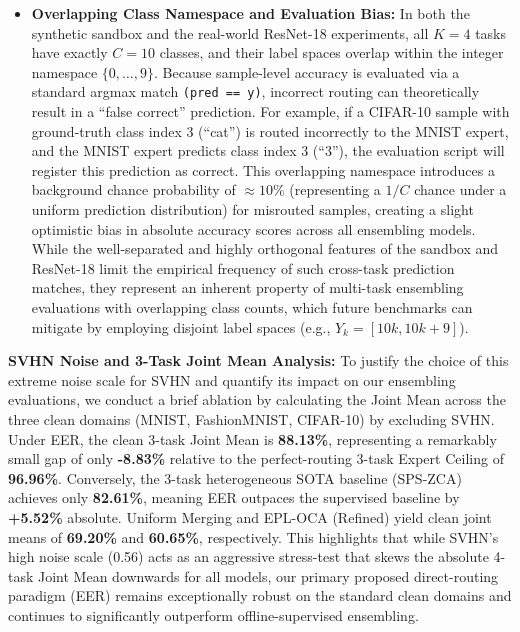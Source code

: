 \begin{itemize}
    \item \textbf{Overlapping Class Namespace and Evaluation Bias:} In both the synthetic sandbox and the real-world ResNet-18 experiments, all $K=4$ tasks have exactly $C=10$ classes, and their label spaces overlap within the integer namespace $\{0, \dots, 9\}$. Because sample-level accuracy is evaluated via a standard argmax match \texttt{(pred == y)}, incorrect routing can theoretically result in a ``false correct'' prediction. For example, if a CIFAR-10 sample with ground-truth class index 3 (``cat'') is routed incorrectly to the MNIST expert, and the MNIST expert predicts class index 3 (``3''), the evaluation script will register this prediction as correct. This overlapping namespace introduces a background chance probability of $\approx 10\%$ (representing a $1/C$ chance under a uniform prediction distribution) for misrouted samples, creating a slight optimistic bias in absolute accuracy scores across all ensembling models. While the well-separated and highly orthogonal features of the sandbox and ResNet-18 limit the empirical frequency of such cross-task prediction matches, they represent an inherent property of multi-task ensembling evaluations with overlapping class counts, which future benchmarks can mitigate by employing disjoint label spaces (e.g., $Y_k = [10k, 10k+9]$).
\end{itemize}

\textbf{SVHN Noise and 3-Task Joint Mean Analysis:} To justify the choice of this extreme noise scale for SVHN and quantify its impact on our ensembling evaluations, we conduct a brief ablation by calculating the Joint Mean across the three clean domains (MNIST, FashionMNIST, CIFAR-10) by excluding SVHN. Under EER, the clean 3-task Joint Mean is \textbf{88.13\%}, representing a remarkably small gap of only \textbf{-8.83\%} relative to the perfect-routing 3-task Expert Ceiling of \textbf{96.96\%}. Conversely, the 3-task heterogeneous SOTA baseline (SPS-ZCA) achieves only \textbf{82.61\%}, meaning EER outpaces the supervised baseline by \textbf{+5.52\%} absolute. Uniform Merging and EPL-OCA (Refined) yield clean joint means of \textbf{69.20\%} and \textbf{60.65\%}, respectively. This highlights that while SVHN's high noise scale (0.56) acts as an aggressive stress-test that skews the absolute 4-task Joint Mean downwards for all models, our primary proposed direct-routing paradigm (EER) remains exceptionally robust on the standard clean domains and continues to significantly outperform offline-supervised ensembling.

